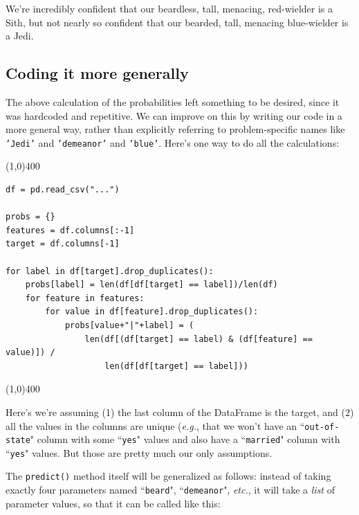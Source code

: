 \documentclass[12pt]{article}
\begin{document}
We're incredibly confident that our beardless, tall, menacing, red-wielder is
a Sith, but not nearly so confident that our bearded, tall, menacing
blue-wielder is a Jedi.

\vspace{.2in}
\subsection{Coding it more generally}

The above calculation of the probabilities left something to be desired, since
it was hardcoded and repetitive. We can improve on this by writing our code in
a more general way, rather than explicitly referring to problem-specific names
like \texttt{'Jedi'} and \texttt{'demeanor'} and \texttt{'blue'}. Here's one
way to do all the calculations:

\pagebreak

\begin{center}
\line(1,0){400}
\end{center}
\footnotesize
\begin{Verbatim}[fontsize=\small,samepage=true,frame=none]
df = pd.read_csv("...")

probs = {}
features = df.columns[:-1]
target = df.columns[-1]

for label in df[target].drop_duplicates():
    probs[label] = len(df[df[target] == label])/len(df)
    for feature in features:
        for value in df[feature].drop_duplicates():
            probs[value+"|"+label] = (
                len(df[(df[target] == label) & (df[feature] == value)]) / 
                    len(df[df[target] == label]))
\end{Verbatim}
\normalsize
\begin{center}
\line(1,0){400}
\end{center}

Here's we're assuming (1) the last column of the DataFrame is the target, and
(2) all the values in the columns are unique (\textit{e.g.}, that we won't
have an ``\texttt{out-of-state}" column with some ``\texttt{yes}" values and
also have a ``\texttt{married}" column with ``\texttt{yes}" values. But those
are pretty much our only assumptions.

The \texttt{predict()} method itself will be generalized as follows: instead
of taking exactly four parameters named ``\texttt{beard}",
``\texttt{demeanor}", \textit{etc.}, it will take a \textit{list} of
parameter values, so that it can be called like this:
\end{document}
